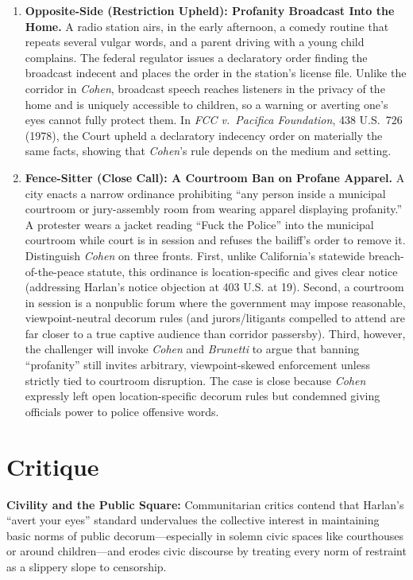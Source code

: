 \documentclass[12pt]{article}
\begin{document}
\begin{enumerate}
\item \textbf{Opposite-Side (Restriction Upheld): Profanity Broadcast Into the Home.} A radio station airs, in the early afternoon, a comedy routine that repeats several vulgar words, and a parent driving with a young child complains. The federal regulator issues a declaratory order finding the broadcast indecent and places the order in the station's license file. Unlike the corridor in \textit{Cohen}, broadcast speech reaches listeners in the privacy of the home and is uniquely accessible to children, so a warning or averting one's eyes cannot fully protect them. In \textit{FCC v.\ Pacifica Foundation}, 438 U.S.\ 726 (1978), the Court upheld a declaratory indecency order on materially the same facts, showing that \textit{Cohen}'s rule depends on the medium and setting.

\item \textbf{Fence-Sitter (Close Call): A Courtroom Ban on Profane Apparel.} A city enacts a narrow ordinance prohibiting ``any person inside a municipal courtroom or jury-assembly room from wearing apparel displaying profanity.'' A protester wears a jacket reading ``Fuck the Police'' into the municipal courtroom while court is in session and refuses the bailiff's order to remove it. Distinguish \textit{Cohen} on three fronts. First, unlike California's statewide breach-of-the-peace statute, this ordinance is location-specific and gives clear notice (addressing Harlan's notice objection at 403 U.S. at 19). Second, a courtroom in session is a nonpublic forum where the government may impose reasonable, viewpoint-neutral decorum rules (and jurors/litigants compelled to attend are far closer to a true captive audience than corridor passersby). Third, however, the challenger will invoke \textit{Cohen} and \textit{Brunetti} to argue that banning ``profanity'' still invites arbitrary, viewpoint-skewed enforcement unless strictly tied to courtroom disruption. The case is close because \textit{Cohen} expressly left open location-specific decorum rules but condemned giving officials power to police offensive words.

\end{enumerate}

\section{Critique}
\textbf{Civility and the Public Square:} Communitarian critics contend that Harlan's ``avert your eyes'' standard undervalues the collective interest in maintaining basic norms of public decorum---especially in solemn civic spaces like courthouses or around children---and erodes civic discourse by treating every norm of restraint as a slippery slope to censorship.
\end{document}
